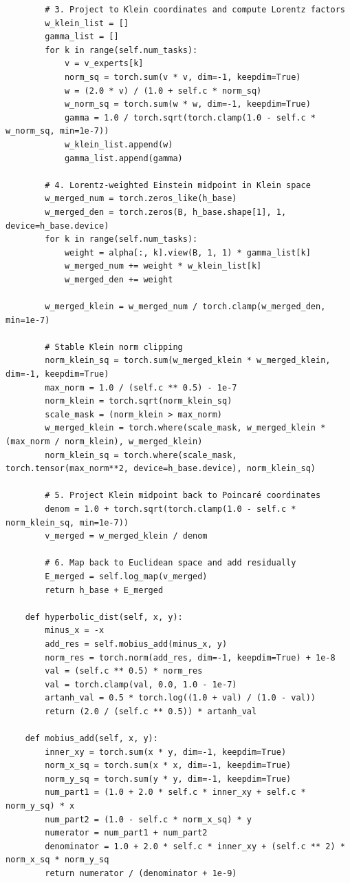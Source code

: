 \documentclass{article}
\theoremstyle{plain}
\theoremstyle{definition}
\theoremstyle{remark}
\begin{document}
\begin{verbatim}
        # 3. Project to Klein coordinates and compute Lorentz factors
        w_klein_list = []
        gamma_list = []
        for k in range(self.num_tasks):
            v = v_experts[k]
            norm_sq = torch.sum(v * v, dim=-1, keepdim=True)
            w = (2.0 * v) / (1.0 + self.c * norm_sq)
            w_norm_sq = torch.sum(w * w, dim=-1, keepdim=True)
            gamma = 1.0 / torch.sqrt(torch.clamp(1.0 - self.c * w_norm_sq, min=1e-7))
            w_klein_list.append(w)
            gamma_list.append(gamma)
            
        # 4. Lorentz-weighted Einstein midpoint in Klein space
        w_merged_num = torch.zeros_like(h_base)
        w_merged_den = torch.zeros(B, h_base.shape[1], 1, device=h_base.device)
        for k in range(self.num_tasks):
            weight = alpha[:, k].view(B, 1, 1) * gamma_list[k]
            w_merged_num += weight * w_klein_list[k]
            w_merged_den += weight
            
        w_merged_klein = w_merged_num / torch.clamp(w_merged_den, min=1e-7)
        
        # Stable Klein norm clipping
        norm_klein_sq = torch.sum(w_merged_klein * w_merged_klein, dim=-1, keepdim=True)
        max_norm = 1.0 / (self.c ** 0.5) - 1e-7
        norm_klein = torch.sqrt(norm_klein_sq)
        scale_mask = (norm_klein > max_norm)
        w_merged_klein = torch.where(scale_mask, w_merged_klein * (max_norm / norm_klein), w_merged_klein)
        norm_klein_sq = torch.where(scale_mask, torch.tensor(max_norm**2, device=h_base.device), norm_klein_sq)
        
        # 5. Project Klein midpoint back to Poincaré coordinates
        denom = 1.0 + torch.sqrt(torch.clamp(1.0 - self.c * norm_klein_sq, min=1e-7))
        v_merged = w_merged_klein / denom
        
        # 6. Map back to Euclidean space and add residually
        E_merged = self.log_map(v_merged)
        return h_base + E_merged

    def hyperbolic_dist(self, x, y):
        minus_x = -x
        add_res = self.mobius_add(minus_x, y)
        norm_res = torch.norm(add_res, dim=-1, keepdim=True) + 1e-8
        val = (self.c ** 0.5) * norm_res
        val = torch.clamp(val, 0.0, 1.0 - 1e-7)
        artanh_val = 0.5 * torch.log((1.0 + val) / (1.0 - val))
        return (2.0 / (self.c ** 0.5)) * artanh_val

    def mobius_add(self, x, y):
        inner_xy = torch.sum(x * y, dim=-1, keepdim=True)
        norm_x_sq = torch.sum(x * x, dim=-1, keepdim=True)
        norm_y_sq = torch.sum(y * y, dim=-1, keepdim=True)
        num_part1 = (1.0 + 2.0 * self.c * inner_xy + self.c * norm_y_sq) * x
        num_part2 = (1.0 - self.c * norm_x_sq) * y
        numerator = num_part1 + num_part2
        denominator = 1.0 + 2.0 * self.c * inner_xy + (self.c ** 2) * norm_x_sq * norm_y_sq
        return numerator / (denominator + 1e-9)
\end{verbatim}
\end{document}
